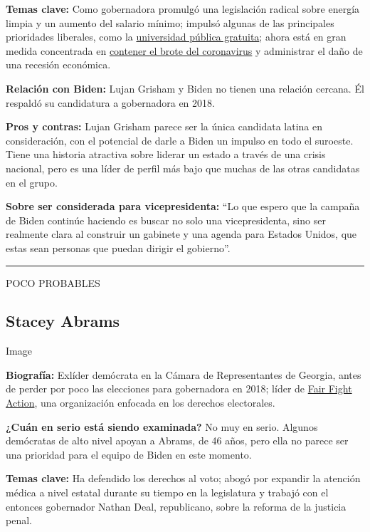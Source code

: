 \textbf{Temas clave:} Como gobernadora promulgó una legislación radical
sobre energía limpia y un aumento del salario mínimo; impulsó algunas de
las principales prioridades liberales, como la
\href{https://www.nytimes.com/2019/09/18/us/new-mexico-free-college-tuition.html}{universidad
pública gratuita}; ahora está en gran medida concentrada en
\href{https://www.nytimes.com/2020/04/24/us/coronavirus-new-mexico.html}{contener
el brote del coronavirus} y administrar el daño de una recesión
económica.

\textbf{Relación con Biden:} Lujan Grisham y Biden no tienen una
relación cercana. Él respaldó su candidatura a gobernadora en 2018.

\textbf{Pros y contras:} Lujan Grisham parece ser la única candidata
latina en consideración, con el potencial de darle a Biden un impulso en
todo el suroeste. Tiene una historia atractiva sobre liderar un estado a
través de una crisis nacional, pero es una líder de perfil más bajo que
muchas de las otras candidatas en el grupo.

\textbf{Sobre ser considerada para vicepresidenta:} ``Lo que espero que
la campaña de Biden continúe haciendo es buscar no solo una
vicepresidenta, sino ser realmente clara al construir un gabinete y una
agenda para Estados Unidos, que estas sean personas que puedan dirigir
el gobierno''.

\begin{center}\rule{0.5\linewidth}{\linethickness}\end{center}

POCO PROBABLES

\hypertarget{stacey-abrams}{%
\subsection{Stacey Abrams}\label{stacey-abrams}}

Image

\textbf{Biografía:} Exlíder demócrata en la Cámara de Representantes de
Georgia, antes de perder por poco las elecciones para gobernadora en
2018; líder de
\href{https://www.nytimes.com/2019/08/13/us/politics/stacey-abrams-fair-fight-2020.html}{Fair
Fight Action}, una organización enfocada en los derechos electorales.

\textbf{¿Cuán en serio está siendo examinada?} No muy en serio. Algunos
demócratas de alto nivel apoyan a Abrams, de 46 años, pero ella no
parece ser una prioridad para el equipo de Biden en este momento.

\textbf{Temas clave:} Ha defendido los derechos al voto; abogó por
expandir la atención médica a nivel estatal durante su tiempo en la
legislatura y trabajó con el entonces gobernador Nathan Deal,
republicano, sobre la reforma de la justicia penal.

